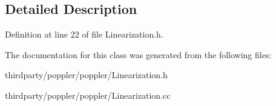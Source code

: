 \subsection{Detailed Description}


Definition at line 22 of file Linearization.\+h.



The documentation for this class was generated from the following files\+:\begin{DoxyCompactItemize}
\item 
thirdparty/poppler/poppler/Linearization.\+h\item 
thirdparty/poppler/poppler/Linearization.\+cc\end{DoxyCompactItemize}

